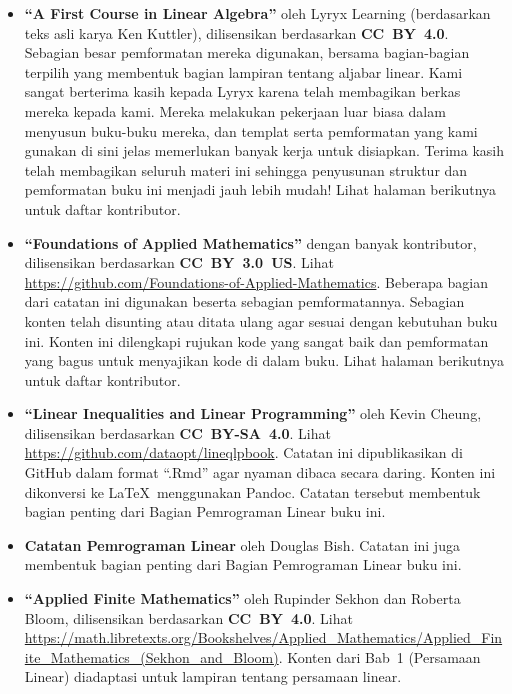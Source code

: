 \begin{itemize}
\item \textbf{``A First Course in Linear Algebra''} oleh Lyryx Learning (berdasarkan teks asli karya Ken Kuttler), dilisensikan berdasarkan \textbf{CC~BY~4.0}. Sebagian besar pemformatan mereka digunakan, bersama bagian-bagian terpilih yang membentuk bagian lampiran tentang aljabar linear. Kami sangat berterima kasih kepada Lyryx karena telah membagikan berkas mereka kepada kami. Mereka melakukan pekerjaan luar biasa dalam menyusun buku-buku mereka, dan templat serta pemformatan yang kami gunakan di sini jelas memerlukan banyak kerja untuk disiapkan. Terima kasih telah membagikan seluruh materi ini sehingga penyusunan struktur dan pemformatan buku ini menjadi jauh lebih mudah! Lihat halaman berikutnya untuk daftar kontributor.

\item \textbf{``Foundations of Applied Mathematics''} dengan banyak kontributor, dilisensikan berdasarkan \textbf{CC~BY~3.0~US}. Lihat \url{https://github.com/Foundations-of-Applied-Mathematics}. Beberapa bagian dari catatan ini digunakan beserta sebagian pemformatannya. Sebagian konten telah disunting atau ditata ulang agar sesuai dengan kebutuhan buku ini. Konten ini dilengkapi rujukan kode yang sangat baik dan pemformatan yang bagus untuk menyajikan kode di dalam buku. Lihat halaman berikutnya untuk daftar kontributor.

\item \textbf{``Linear Inequalities and Linear Programming''} oleh
Kevin Cheung, dilisensikan berdasarkan \textbf{CC~BY-SA~4.0}. Lihat \url{https://github.com/dataopt/lineqlpbook}. Catatan ini dipublikasikan di GitHub dalam format ``.Rmd'' agar nyaman dibaca secara daring. Konten ini dikonversi ke \LaTeX\ menggunakan Pandoc. Catatan tersebut membentuk bagian penting dari Bagian Pemrograman Linear buku ini.

\item \textbf{Catatan Pemrograman Linear} oleh Douglas Bish. Catatan ini juga membentuk bagian penting dari Bagian Pemrograman Linear buku ini.

\item \textbf{``Applied Finite Mathematics''} oleh Rupinder Sekhon dan Roberta Bloom, dilisensikan berdasarkan \textbf{CC~BY~4.0}. Lihat \url{https://math.libretexts.org/Bookshelves/Applied_Mathematics/Applied_Finite_Mathematics_(Sekhon_and_Bloom)}. Konten dari Bab~1 (Persamaan Linear) diadaptasi untuk lampiran tentang persamaan linear.
\end{itemize}


